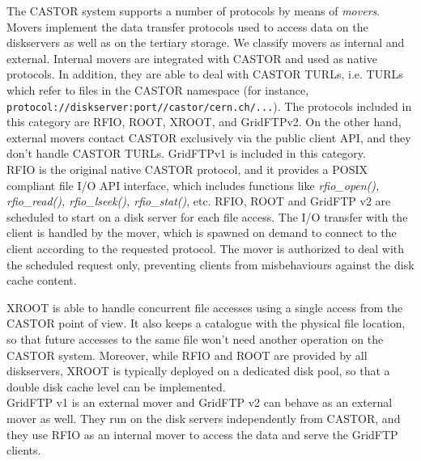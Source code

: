 
The CASTOR system supports a number of protocols by means of \textit{movers}.
Movers implement the data transfer protocols used
to access data on the diskservers as well as on the tertiary storage.
We classify movers as internal and external. Internal movers are integrated 
with CASTOR and used as native protocols. In addition, they are able to deal with CASTOR TURLs, 
i.e. TURLs which refer to files in the CASTOR namespace (for instance,
\texttt{protocol://diskserver:port//castor/cern.ch/...}). The protocols included in
this category are RFIO, ROOT, XROOT, and GridFTPv2. On the other hand, external 
movers contact CASTOR exclusively via the public client API, and they 
don't handle CASTOR TURLs. GridFTPv1 is included in this category.\\

RFIO is the original native CASTOR protocol, and it provides a POSIX compliant file I/O API interface,
which includes functions like \textit{rfio\_open(), rfio\_read(), rfio\_lseek(), rfio\_stat()}, etc.
RFIO, ROOT and GridFTP v2 are scheduled to start on a disk server for each file access. The I/O transfer with
the client is handled by the mover, which is spawned on demand to connect to the client according
to the requested protocol. The mover is authorized to deal with the scheduled request only,
preventing clients from misbehaviours against the disk cache content.

XROOT is able to handle concurrent file accesses using a single access
from the CASTOR point of view. It also keeps a catalogue with
the physical file location, so that future accesses to the same file won't need
another operation on the CASTOR system. Moreover, while RFIO and ROOT are
provided by all diskservers, XROOT is typically deployed on a dedicated disk pool,
so that a double disk cache level can be implemented.\\

GridFTP v1 is an external mover and GridFTP v2 can behave as
an external mover as well. They run on the disk servers independently from CASTOR,
and they use RFIO as an internal mover to access the data and serve the GridFTP clients.

